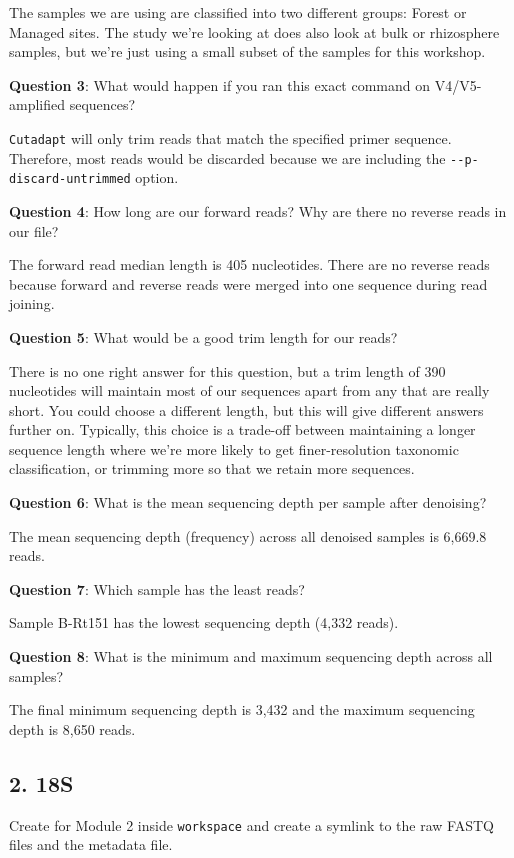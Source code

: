 \documentclass[
]{book}
\begin{document}
The samples we are using are classified into two different groups: Forest or Managed sites. The study we're looking at does also look at bulk or rhizosphere samples, but we're just using a small subset of the samples for this workshop.

\textbf{Question 3}: What would happen if you ran this exact command on V4/V5-amplified sequences?

\texttt{Cutadapt} will only trim reads that match the specified primer sequence. Therefore, most reads would be discarded because we are including the \texttt{-\/-p-discard-untrimmed} option.

\textbf{Question 4}: How long are our forward reads? Why are there no reverse reads in our file?

The forward read median length is 405 nucleotides. There are no reverse reads because forward and reverse reads were merged into one sequence during read joining.

\textbf{Question 5}: What would be a good trim length for our reads?

There is no one right answer for this question, but a trim length of 390 nucleotides will maintain most of our sequences apart from any that are really short. You could choose a different length, but this will give different answers further on. Typically, this choice is a trade-off between maintaining a longer sequence length where we're more likely to get finer-resolution taxonomic classification, or trimming more so that we retain more sequences.

\textbf{Question 6}: What is the mean sequencing depth per sample after denoising?

The mean sequencing depth (frequency) across all denoised samples is 6,669.8 reads.

\textbf{Question 7}: Which sample has the least reads?

Sample B-Rt151 has the lowest sequencing depth (4,332 reads).

\textbf{Question 8}: What is the minimum and maximum sequencing depth across all samples?

The final minimum sequencing depth is 3,432 and the maximum sequencing depth is 8,650 reads.

\subsection{2. 18S}\label{s-1}

Create for Module 2 inside \texttt{workspace} and create a symlink to the raw FASTQ files and the metadata file.
\end{document}
